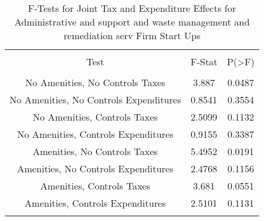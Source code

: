 
\begin{table}[!htbp] \centering 
  \caption{F-Tests for Joint Tax and Expenditure Effects for Administrative and support and waste management and remediation serv Firm Start Ups} 
  \label{56Ftests} 
\begin{tabular}{@{\extracolsep{5pt}} ccc} 
\\[-1.8ex]\hline 
\hline \\[-1.8ex] 
Test & F-Stat & P(\textgreater F) \\ 
\hline \\[-1.8ex] 
No Amenities, No Controls Taxes & 3.887 & 0.0487 \\ 
No Amenities, No Controls Expenditures & 0.8541 & 0.3554 \\ 
No Amenities, Controls Taxes & 2.5099 & 0.1132 \\ 
No Amenities, Controls Expenditures & 0.9155 & 0.3387 \\ 
Amenities, No Controls Taxes & 5.4952 & 0.0191 \\ 
Amenities, No Controls Expenditures & 2.4768 & 0.1156 \\ 
Amenities, Controls Taxes & 3.681 & 0.0551 \\ 
Amenities, Controls Expenditures & 2.5101 & 0.1131 \\ 
\hline \\[-1.8ex] 
\end{tabular} 
\end{table} 
